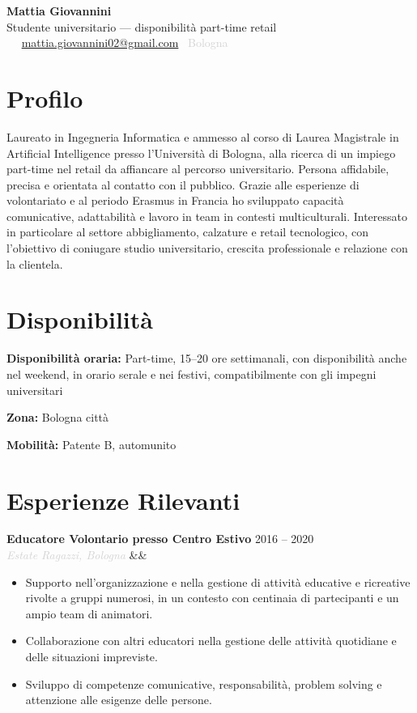 \documentclass[a4paper,10pt]{article}
\newcommand{\entrylist}[5]{%
  \noindent\textbf{#1} \hfill \textcolor{accent}{#2}\\
  \textit{\textcolor{lightgray}{#3}}%
  \ifx&#4&\else\\\vspace{0.15em}#4\fi
  \vspace{0.2em}
  \begin{itemize}#5\end{itemize}
  \vspace{0.25em}
}
\newcommand{\skillgroup}[2]{%
  \noindent\textbf{#1:} #2\par\vspace{0.25em}
}
\begin{document}
\begin{center}
  {\Huge\bfseries\color{darkgray} Mattia Giovannini}\\[0.35em]
  {\large\color{accent} Studente universitario — disponibilità part-time retail}\\[0.65em]
  \textcolor{lightgray}{
    \faPhone\ \PrivatePhone
    \quad\textbullet\quad
    \faEnvelope\ \href{mailto:mattia.giovannini02@gmail.com}{mattia.giovannini02@gmail.com}
    \quad\textbullet\quad
    \faMapMarker*\ Bologna
  }
\end{center}

\vspace{0.35em}

\section{Profilo}

Laureato in Ingegneria Informatica e ammesso al corso di Laurea Magistrale in Artificial Intelligence presso l'Università di Bologna, alla ricerca di un impiego part-time nel retail da affiancare al percorso universitario. Persona affidabile, precisa e orientata al contatto con il pubblico. Grazie alle esperienze di volontariato e al periodo Erasmus in Francia ho sviluppato capacità comunicative, adattabilità e lavoro in team in contesti multiculturali. Interessato in particolare al settore abbigliamento, calzature e retail tecnologico, con l'obiettivo di coniugare studio universitario, crescita professionale e relazione con la clientela.

\section{Disponibilità}

\skillgroup{Disponibilità oraria}{Part-time, 15--20 ore settimanali, con disponibilità anche nel weekend, in orario serale e nei festivi, compatibilmente con gli impegni universitari}
\skillgroup{Zona}{Bologna città}
\skillgroup{Mobilità}{Patente B, automunito}

\section{Esperienze Rilevanti}

\entrylist{Educatore Volontario presso Centro Estivo}{2016 -- 2020}{Estate Ragazzi, Bologna}{}{
  \item Supporto nell'organizzazione e nella gestione di attività educative e ricreative rivolte a gruppi numerosi, in un contesto con centinaia di partecipanti e un ampio team di animatori.
  \item Collaborazione con altri educatori nella gestione delle attività quotidiane e delle situazioni impreviste.
  \item Sviluppo di competenze comunicative, responsabilità, problem solving e attenzione alle esigenze delle persone.
}
\end{document}
